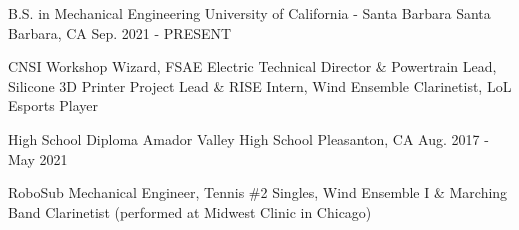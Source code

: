


\begin{cventries}

\cventry
{B.S. in Mechanical Engineering} %
{University of California - Santa Barbara} %
{Santa Barbara, CA} %
{Sep. 2021 - PRESENT} %
{ %
\begin{cvitems}
\item {CNSI Workshop Wizard, FSAE Electric Technical Director \& Powertrain Lead, Silicone 3D Printer Project Lead \& RISE Intern, Wind Ensemble Clarinetist, LoL Esports Player}
\end{cvitems}
}

\cventry
{High School Diploma} %
{Amador Valley High School} %
{Pleasanton, CA} %
{Aug. 2017 - May 2021} %
{ %
\begin{cvitems}
\item{RoboSub Mechanical Engineer, Tennis \#2 Singles, Wind Ensemble I \& Marching Band Clarinetist (performed at Midwest Clinic in Chicago)}
\end{cvitems}
}




\end{cventries}